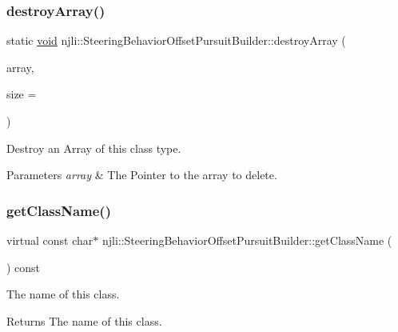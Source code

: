 \subsubsection{\texorpdfstring{destroy\+Array()}{destroyArray()}}
{\footnotesize\ttfamily static \mbox{\hyperlink{_thread_8h_af1e856da2e658414cb2456cb6f7ebc66}{void}} njli\+::\+Steering\+Behavior\+Offset\+Pursuit\+Builder\+::destroy\+Array (\begin{DoxyParamCaption}\item[{\mbox{\hyperlink{classnjli_1_1_steering_behavior_offset_pursuit_builder}{Steering\+Behavior\+Offset\+Pursuit\+Builder}} $\ast$$\ast$}]{array,  }\item[{const \mbox{\hyperlink{_util_8h_a10e94b422ef0c20dcdec20d31a1f5049}{u32}}}]{size = {} }\end{DoxyParamCaption})\hspace{0.3cm}{\ttfamily [static]}}

Destroy an Array of this class type.


\begin{DoxyParams}{Parameters}
{\em array} & The Pointer to the array to delete. \\
\hline
\end{DoxyParams}
\mbox{\label{classnjli_1_1_steering_behavior_offset_pursuit_builder_a49be76d9201bf181af5e96ae368e90e9}} 
\subsubsection{\texorpdfstring{get\+Class\+Name()}{getClassName()}}
{\footnotesize\ttfamily virtual const char$\ast$ njli\+::\+Steering\+Behavior\+Offset\+Pursuit\+Builder\+::get\+Class\+Name (\begin{DoxyParamCaption}{ }\end{DoxyParamCaption}) const\hspace{0.3cm}{\ttfamily [virtual]}}

The name of this class.

\begin{DoxyReturn}{Returns}
The name of this class. 
\end{DoxyReturn}


